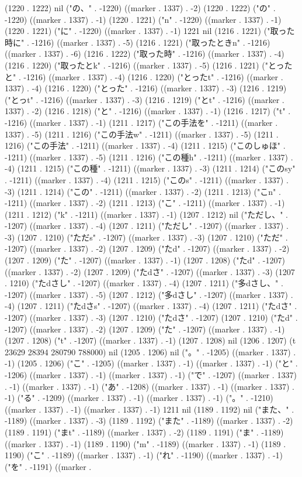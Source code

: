 (1220 . 1222) nil ("の、" . -1220) ((marker . 1337) . -2) (1220 . 1222) ("の" . -1220) ((marker . 1337) . -1) (1220 . 1221) ("n" . -1220) ((marker . 1337) . -1) (1220 . 1221) ("に" . -1220) ((marker . 1337) . -1) 1221 nil (1216 . 1221) ("取った時に" . -1216) ((marker . 1337) . -5) (1216 . 1221) ("取ったときn" . -1216) ((marker . 1337) . -6) (1216 . 1222) ("取った時" . -1216) ((marker . 1337) . -4) (1216 . 1220) ("取ったとk" . -1216) ((marker . 1337) . -5) (1216 . 1221) ("とったと" . -1216) ((marker . 1337) . -4) (1216 . 1220) ("とったt" . -1216) ((marker . 1337) . -4) (1216 . 1220) ("とった" . -1216) ((marker . 1337) . -3) (1216 . 1219) ("とっt" . -1216) ((marker . 1337) . -3) (1216 . 1219) ("とt" . -1216) ((marker . 1337) . -2) (1216 . 1218) ("と" . -1216) ((marker . 1337) . -1) (1216 . 1217) ("t" . -1216) ((marker . 1337) . -1) (1211 . 1217) ("この手法を" . -1211) ((marker . 1337) . -5) (1211 . 1216) ("この手法w" . -1211) ((marker . 1337) . -5) (1211 . 1216) ("この手法" . -1211) ((marker . 1337) . -4) (1211 . 1215) ("このしゅほ" . -1211) ((marker . 1337) . -5) (1211 . 1216) ("この種h" . -1211) ((marker . 1337) . -4) (1211 . 1215) ("この種" . -1211) ((marker . 1337) . -3) (1211 . 1214) ("このsy" . -1211) ((marker . 1337) . -4) (1211 . 1215) ("このs" . -1211) ((marker . 1337) . -3) (1211 . 1214) ("この" . -1211) ((marker . 1337) . -2) (1211 . 1213) ("こn" . -1211) ((marker . 1337) . -2) (1211 . 1213) ("こ" . -1211) ((marker . 1337) . -1) (1211 . 1212) ("k" . -1211) ((marker . 1337) . -1) (1207 . 1212) nil ("ただし、" . -1207) ((marker . 1337) . -4) (1207 . 1211) ("ただし" . -1207) ((marker . 1337) . -3) (1207 . 1210) ("ただs" . -1207) ((marker . 1337) . -3) (1207 . 1210) ("ただ" . -1207) ((marker . 1337) . -2) (1207 . 1209) ("たd" . -1207) ((marker . 1337) . -2) (1207 . 1209) ("た" . -1207) ((marker . 1337) . -1) (1207 . 1208) ("たd" . -1207) ((marker . 1337) . -2) (1207 . 1209) ("たdさ" . -1207) ((marker . 1337) . -3) (1207 . 1210) ("たdさし" . -1207) ((marker . 1337) . -4) (1207 . 1211) ("多dさし、" . -1207) ((marker . 1337) . -5) (1207 . 1212) ("多dさし" . -1207) ((marker . 1337) . -4) (1207 . 1211) ("たdさs" . -1207) ((marker . 1337) . -4) (1207 . 1211) ("たdさ" . -1207) ((marker . 1337) . -3) (1207 . 1210) ("たdさ" . -1207) (1207 . 1210) ("たd" . -1207) ((marker . 1337) . -2) (1207 . 1209) ("た" . -1207) ((marker . 1337) . -1) (1207 . 1208) ("t" . -1207) ((marker . 1337) . -1) (1207 . 1208) nil (1206 . 1207) (t 23629 28394 280790 788000) nil (1205 . 1206) nil ("。" . -1205) ((marker . 1337) . -1) (1205 . 1206) ("こ" . -1205) ((marker . 1337) . -1) ((marker . 1337) . -1) ("と" . -1206) ((marker . 1337) . -1) ((marker . 1337) . -1) ("で" . -1207) ((marker . 1337) . -1) ((marker . 1337) . -1) ("あ" . -1208) ((marker . 1337) . -1) ((marker . 1337) . -1) ("る" . -1209) ((marker . 1337) . -1) ((marker . 1337) . -1) ("。" . -1210) ((marker . 1337) . -1) ((marker . 1337) . -1) 1211 nil (1189 . 1192) nil ("また、" . -1189) ((marker . 1337) . -3) (1189 . 1192) ("また" . -1189) ((marker . 1337) . -2) (1189 . 1191) ("まt" . -1189) ((marker . 1337) . -2) (1189 . 1191) ("ま" . -1189) ((marker . 1337) . -1) (1189 . 1190) ("m" . -1189) ((marker . 1337) . -1) (1189 . 1190) ("こ" . -1189) ((marker . 1337) . -1) ("れ" . -1190) ((marker . 1337) . -1) ("を" . -1191) ((marker . 
